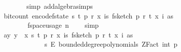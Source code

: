 \begin{isabellebody}
\ \ \ \ \ \ \isamarkupfalse%
\ {\isacharparenleft}{\kern0pt}simp\ add{\isacharcolon}{\kern0pt}algebra{\isacharunderscore}{\kern0pt}simps{\isacharparenright}{\kern0pt}\isanewline
\ \ \ \ \isamarkupfalse%
\ \isamarkupfalse%
\ {\isachardoublequoteopen}bit{\isacharunderscore}{\kern0pt}count\ {\isacharparenleft}{\kern0pt}encode{\isacharunderscore}{\kern0pt}f{}{\isacharunderscore}{\kern0pt}state\ {\isacharparenleft}{\kern0pt}s{\isacharcomma}{\kern0pt}\ t{\isacharcomma}{\kern0pt}\ p{\isacharcomma}{\kern0pt}\ r{\isacharcomma}{\kern0pt}\ x{\isacharcomma}{\kern0pt}\ {\isasymlambda}i{\isasymin}{\isacharbraceleft}{\kern0pt}{}{\isachardot}{\kern0pt}{\isachardot}{\kern0pt}{\isacharless}{\kern0pt}s{\isacharbraceright}{\kern0pt}{\isachardot}{\kern0pt}\ f{}{\isacharunderscore}{\kern0pt}sketch\ p\ r\ t\ {\isacharparenleft}{\kern0pt}x\ i{\isacharparenright}{\kern0pt}\ as{\isacharparenright}{\kern0pt}{\isacharparenright}{\kern0pt}\ {\isasymle}\ \isanewline
\ \ \ \ \ \ \ \ f{}{\isacharunderscore}{\kern0pt}space{\isacharunderscore}{\kern0pt}usage\ {\isacharparenleft}{\kern0pt}n{\isacharcomma}{\kern0pt}\ {\isasymepsilon}{\isacharcomma}{\kern0pt}\ {\isasymdelta}{\isacharparenright}{\kern0pt}{\isachardoublequoteclose}\ \isamarkupfalse%
\ simp\isanewline
\ \ \isamarkupfalse%
\isanewline
\ \ \isanewline
\ \ \isamarkupfalse%
\ a{\isacharcolon}{\kern0pt}{\isachardoublequoteopen}{\isasymAnd}y{\isachardot}{\kern0pt}\ y\ {\isasymin}\ {\isacharparenleft}{\kern0pt}{\isasymlambda}x{\isachardot}{\kern0pt}\ {\isacharparenleft}{\kern0pt}s{\isacharcomma}{\kern0pt}\ t{\isacharcomma}{\kern0pt}\ p{\isacharcomma}{\kern0pt}\ r{\isacharcomma}{\kern0pt}\ x{\isacharcomma}{\kern0pt}\ {\isasymlambda}i{\isasymin}{\isacharbraceleft}{\kern0pt}{}{\isachardot}{\kern0pt}{\isachardot}{\kern0pt}{\isacharless}{\kern0pt}s{\isacharbraceright}{\kern0pt}{\isachardot}{\kern0pt}\ f{}{\isacharunderscore}{\kern0pt}sketch\ p\ r\ t\ {\isacharparenleft}{\kern0pt}x\ i{\isacharparenright}{\kern0pt}\ as{\isacharparenright}{\kern0pt}{\isacharparenright}{\kern0pt}\ {\isacharbackquote}{\kern0pt}\isanewline
\ \ \ \ \ \ \ \ \ \ \ \ \ {\isacharparenleft}{\kern0pt}{\isacharbraceleft}{\kern0pt}{}{\isachardot}{\kern0pt}{\isachardot}{\kern0pt}{\isacharless}{\kern0pt}s{\isacharbraceright}{\kern0pt}\ {\isasymrightarrow}\isactrlsub E\ bounded{\isacharunderscore}{\kern0pt}degree{\isacharunderscore}{\kern0pt}polynomials\ {\isacharparenleft}{\kern0pt}ZFact\ {\isacharparenleft}{\kern0pt}int\ p{\isacharparenright}{\kern0pt}{\isacharparenright}{\kern0pt}\ {}{\isacharparenright}{\kern0pt}\ {\isasymLongrightarrow}\isanewline

\end{isabellebody}
